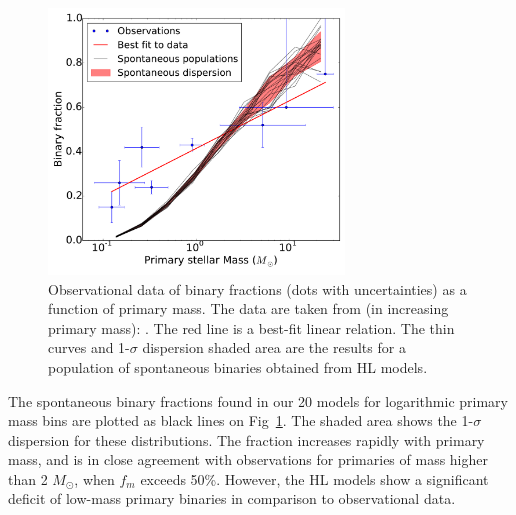 \begin{figure}
\begin{center}
\includegraphics[width=0.7\textwidth]{Figures/5_spontaneous_primarymass}
\caption[Spontaneous binary population: fraction vs primary mass]{Observational data of binary fractions (dots with uncertainties) as a function of primary mass. The data are taken from (in increasing primary mass): \protect\cite{Close2003,Basri2006,Fischer1992,Ward-Duong2015,Raghavan2010,Patience2002,Preibisch1999,Mason1998}. The red line is a  best-fit linear relation. The thin curves and 1-$\sigma$ dispersion shaded area are the results for a population of  spontaneous binaries obtained from HL  models.}
\label{Fig:5_spontaneous_primarymass}
\end{center}
\end{figure}




The spontaneous binary fractions found in our 20 \HubLem models for logarithmic primary mass bins are plotted as black lines on Fig~\ref{Fig:5_spontaneous_primarymass}. The shaded area shows the 1-$\sigma$ dispersion for these distributions. The fraction increases rapidly  with primary mass,  and is in close agreement with observations for primaries of mass higher than 2 $M_\odot$, when $f_m$ exceeds 50\%.  However, the HL  models show  a significant deficit of low-mass primary binaries in comparison to observational data.  

